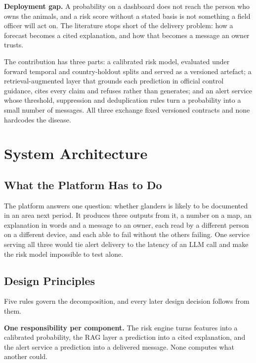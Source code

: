 \documentclass[10pt,openany]{report}
\begin{document}
\textbf{Deployment gap.} A probability on a dashboard does not reach the person who owns the
animals, and a risk score without a stated basis is not something a field officer will act on. The
literature stops short of the delivery problem: how a forecast becomes a cited explanation, and how
that becomes a message an owner trusts.

The contribution has three parts: a calibrated risk model, evaluated under forward temporal and
country-holdout splits and served as a versioned artefact; a retrieval-augmented layer that grounds
each prediction in official control guidance, cites every claim and refuses rather than generates;
and an alert service whose threshold, suppression and deduplication rules turn a probability into a
small number of messages. All three exchange fixed versioned contracts and none hardcodes the
disease.

\chapter{System Architecture}
\label{ch:arch}

\section{What the Platform Has to Do}

The platform answers one question: whether glanders is likely to be documented in an area next
period. It produces three outputs from it, a number on a map, an explanation in words and a message to
an owner, each read by a different person on a different device, and each able to fail without the
others failing. One service serving all three would tie alert delivery to the latency of an LLM call
and make the risk model impossible to test alone.



\section{Design Principles}

Five rules govern the decomposition, and every later design decision follows from them.

\textbf{One responsibility per component.} The risk engine turns features into a calibrated
probability, the RAG layer a prediction into a cited explanation, and the alert service a prediction
into a delivered message. None computes what another could.
\end{document}
